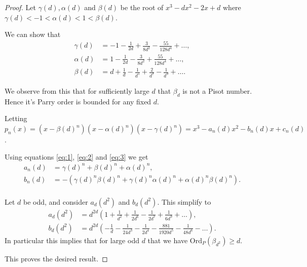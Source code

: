 \documentclass[10pt,a4paper]{amsart}
\newcommand{\OrdP}{\mathrm{Ord}_{P}}
\begin{document}
\begin{proof}
    Let $\gamma(d), \alpha(d)$ and $\beta(d)$ be the root of $x^3-d x^2-2 x + d$ where
    $\gamma(d) < -1 < \alpha(d) < 1 < \beta(d)$.

    We can show that
    \begin{align}
    \gamma(d) & = -1-\frac{1}{2d} + \frac{3}{8 d^2} - \frac{55}{128 d^4} + \dots, \label{eq:1} \\
    \alpha(d) & = 1-\frac{1}{2d} - \frac{3}{8 d^2} + \frac{55}{128 d^4} + \dots, \label{eq:2} \\
    \beta(d) & = d + \frac{1}{d} - \frac{1}{d^5} + \frac{2}{d^7} - \frac{1}{d^9} + \dots.  \label{eq:3}
    \end{align}

    We observe from this that for sufficiently large $d$ that $\beta_d$ is not a Pisot number.  Hence it's Parry order is bounded for any fixed $d$.

    Letting $p_n(x) = (x-\beta(d)^n) (x-\alpha(d)^n) ( x- \gamma(d)^n) = x^3 - a_n(d) x^2 - b_n(d) x + c_n(d)$.

    Using equations \eqref{eq:1}, \eqref{eq:2} and \eqref{eq:3} we get 
    \begin{align*}
        a_n(d) & = 
            \gamma(d)^n + \beta(d)^n + \alpha(d)^n, \\
        b_n(d) & = -(\gamma(d)^n \beta(d)^n + \gamma(d)^n \alpha(d)^n + \alpha(d)^n \beta(d)^n). \\
    \end{align*}

    Let $d$ be odd, and consider $a_d(d^2)$ and $b_d(d^2)$. 
    This simplify to 
    \begin{align*}
        a_d(d^2) & = d^{2d} \left( 1 + \frac{1}{d^2} + \frac{1}{2 d^6} - \frac{1}{2 d^7} + \frac{1}{6 d^9} + \dots \right), \\
        b_d(d^2) & = d^{2d} \left(-\frac{1}{d} - \frac{1}{24 d^3} - \frac{1}{2 d^4} - \frac{881}{1920 d^5} - \frac{1}{48 d^6} - \dots \right).         
    \end{align*}
    In particular this implies that for large odd $d$ that we have $\OrdP(\beta_{d^2}) \geq d$.

This proves the desired result.
\end{proof}
\end{document}
